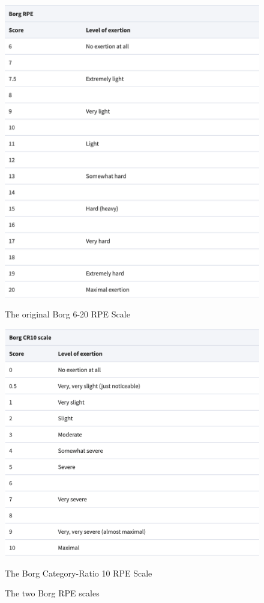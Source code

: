\begin{figure}
  \begin{minipage}[c]{0.4\linewidth}
      \centering
      \includegraphics[width=\linewidth]{figures/borg20.png}
      \captionsetup{justification=centering}
      \caption[Borg 20]{The original Borg 6-20 RPE Scale \cite{Williams2017}} \label{fig:borg20}
  \end{minipage}\hfill
  \begin{minipage}[c]{0.4\linewidth}
      \centering
      \includegraphics[width=\linewidth]{figures/borgc10.png}
      \captionsetup{justification=centering}
      \caption[Borg CR10]{The Borg Category-Ratio 10 RPE Scale \cite{Williams2017}}\label{fig:borgcr10}
  \end{minipage}
  \caption*{The two Borg RPE scales}
\end{figure}

